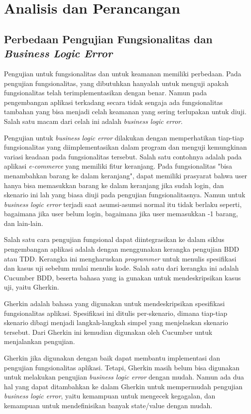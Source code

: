 \chapter{Analisis dan Perancangan}

\section{Perbedaan Pengujian Fungsionalitas dan \emph{Business Logic Error}}

Pengujian untuk fungsionalitas dan untuk keamanan memiliki perbedaan. 
Pada pengujian fungsionalitas, yang dibutuhkan hanyalah untuk menguji apakah
fungsionalitas telah terimplementasikan dengan benar.
Namun pada pengembangan aplikasi terkadang secara tidak sengaja ada fungsionalitas
tambahan yang bisa menjadi celah keamanan yang sering terlupakan untuk diuji.
Salah satu macam dari celah ini adalah \emph{business logic error}.

Pengujian untuk \emph{business logic error} dilakukan dengan memperhatikan tiap-tiap fungsionalitas
yang diimplementasikan dalam program dan menguji kemungkinan variasi keadaan pada
fungsionalitas tersebut. Salah satu contohnya adalah pada aplikasi \emph{e-commerce} yang memiliki
fitur keranjang. Pada fungsionalitas "bisa menambahkan barang ke dalam keranjang", dapat memiliki
prasyarat bahwa user hanya bisa memasukkan barang ke dalam keranjang jika sudah login, dan skenario
ini lah yang biasa diuji pada pengujian fungsionalitasnya. Namun untuk \emph{business logic error} 
terjadi saat asumsi-asumsi normal itu tidak berlaku seperti, bagaimana jika user belum login,
bagaimana jika user memasukkan -1 barang, dan lain-lain.

Salah satu cara pengujian fungsional dapat diintegrasikan ke dalam siklus pengembangan aplikasi
adalah dengan menggunakan kerangka pengujian BDD atau TDD. Kerangka ini mengharuskan \emph{programmer}
untuk menulis spesifikasi dan kasus uji sebelum mulai menulis kode.
Salah satu dari kerangka ini adalah Cucumber BDD, beserta bahasa yang ia gunakan untuk mendeskripsikan
kasus uji, yaitu Gherkin.

Gherkin adalah bahasa yang digunakan untuk mendeskripsikan spesifikasi fungsionalitas
aplikasi. Spesifikasi ini ditulis per-skenario, dimana tiap-tiap skenario dibagi menjadi
langkah-langkah simpel yang menjelaskan skenario tersebut. Dari Gherkin ini kemudian
digunakan oleh Cucumber untuk menjalankan pengujian.

Gherkin jika digunakan dengan baik dapat membantu implementasi dan
pengujian fungsionalitas aplikasi. Tetapi, Gherkin masih belum bisa digunakan untuk melakukan
pengujian \emph{business logic error} dengan mudah. Namun ada dua hal yang dapat ditambahkan
ke dalam Gherkin untuk mempermudah pengujian \emph{business logic error}, yaitu kemampuan untuk
mengecek kegagalan, dan kemampuan untuk mendefinisikan banyak state/value dengan mudah.

